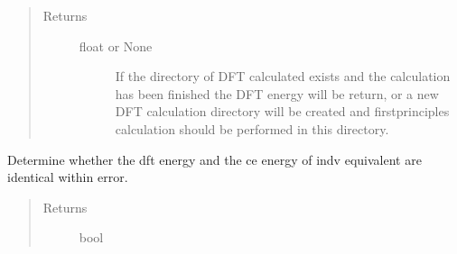 \documentclass[letterpaper,10pt,english]{sphinxmanual}
\begin{document}
\begin{fulllineitems}
\begin{fulllineitems}
\begin{quote}
\begin{description}
\begin{description}
\end{description}

\item[{Returns}] \leavevmode\begin{description}
\item[{float or None}] \leavevmode
\sphinxAtStartPar
If the directory of DFT calculated exists and the calculation has
been finished the DFT energy will be return, or a new DFT
calculation directory will be created and first\sphinxhyphen{}principles
calculation should be performed in this directory.

\end{description}

\end{description}\end{quote}

\end{fulllineitems}


\begin{fulllineitems}
\label{\detokenize{pygace:pygace.utility.EleIndv.is_correct}}
\sphinxAtStartPar
Determine whether the dft energy and the ce energy of indv equivalent
are identical within error.
\begin{quote}\begin{description}
\item[{Returns}] \leavevmode\begin{description}
\item[{bool}] \leavevmode
\end{description}

\end{description}\end{quote}

\end{fulllineitems}


\begin{fulllineitems}
\label{\detokenize{pygace:pygace.utility.EleIndv.set_app}}~
\end{fulllineitems}


\end{fulllineitems}
\end{document}
